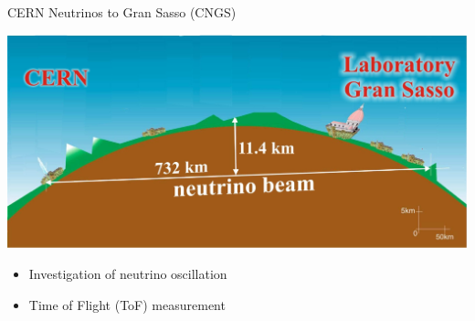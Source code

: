 \documentclass[compress,red]{beamer}
\begin{document}
\begin{frame}{CERN Neutrinos to Gran Sasso (CNGS)}

    \begin{center}
      \includegraphics[height=0.5\textheight]{applications/cngs-general.pdf}
    \end{center}

    \begin{center}
      \begin{itemize}
	\item Investigation of neutrino oscillation
	\item Time of Flight (ToF) measurement
      \end{itemize}

    \end{center}

\end{frame}
\end{document}
